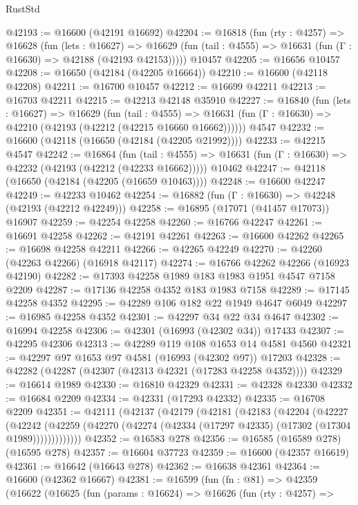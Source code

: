 \begin{lexlean}{RustStd}
\begin{coremodule}
@42193 := @16600 (@42191 @16692)
@42204 := @16818
    (fun (rty : @4257) =>
    @16628
      (fun (lets : @16627) =>
      @16629 (fun (tail : @4555) => @16631 (fun (Γ : @16630) => @42188 (@42193 @42153)))))
    @10457
@42205 := @16656 @10457
@42208 := @16650 (@42184 (@42205 @16664))
@42210 := @16600 (@42118 @42208)
@42211 := @16700 @10457
@42212 := @16699 @42211
@42213 := @16703 @42211
@42215 := @42213 @42148 @35910
@42227 := @16840
    (fun (lets : @16627) =>
    @16629
      (fun (tail : @4555) =>
      @16631 (fun (Γ : @16630) => @42210 (@42193 (@42212 (@42215 @16660 @16662))))))
    @4547
@42232 := @16600 (@42118 (@16650 (@42184 (@42205 @21992))))
@42233 := @42215 @4547
@42242 := @16864
    (fun (tail : @4555) => @16631 (fun (Γ : @16630) => @42232 (@42193 (@42212 (@42233 @16662)))))
    @10462
@42247 := @42118 (@16650 (@42184 (@42205 (@16659 @10463))))
@42248 := @16600 @42247
@42249 := @42233 @10462
@42254 := @16882 (fun (Γ : @16630) => @42248 (@42193 (@42212 @42249)))
@42258 := @16895 (@17071 (@41457 @17073)) @16907
@42259 := @42254 @42258
@42260 := @16766 @42247
@42261 := @16691 @42258
@42262 := @42191 @42261
@42263 := @16600 @42262
@42265 := @16698 @42258 @42211
@42266 := @42265 @42249
@42270 := @42260 (@42263 @42266) (@16918 @42117)
@42274 := @16766 @42262 @42266 (@16923 @42190)
@42282 := @17393 @42258 @1989 @183 @1983 @1951 @4547 @7158 @2209
@42287 := @17136 @42258 @4352 @183 @1983 @7158
@42289 := @17145 @42258 @4352
@42295 := @42289 @106 @182 @22 @1949 @4647 @6049
@42297 := @16985 @42258 @4352
@42301 := @42297 @34 @22 @34 @4647
@42302 := @16994 @42258
@42306 := @42301 (@16993 (@42302 @34)) @17433
@42307 := @42295 @42306
@42313 := @42289 @119 @108 @1653 @14 @4581 @4560
@42321 := @42297 @97 @1653 @97 @4581 (@16993 (@42302 @97)) @17203
@42328 := @42282 (@42287 (@42307 (@42313 @42321 (@17283 @42258 @4352))))
@42329 := @16614 @1989
@42330 := @16810 @42329
@42331 := @42328 @42330
@42332 := @16684 @2209
@42334 := @42331 (@17293 @42332)
@42335 := @16708 @2209
@42351 := @42111
    (@42137
      (@42179
        (@42181
          (@42183
            (@42204
              (@42227
                (@42242
                  (@42259 (@42270 (@42274 (@42334 (@17297 @42335) (@17302 (@17304 @1989)))))))))))))
@42352 := @16583 @278
@42356 := @16585 (@16589 @278) (@16595 @278)
@42357 := @16604 @37723
@42359 := @16600 (@42357 @16619)
@42361 := @16642 (@16643 @278)
@42362 := @16638 @42361
@42364 := @16600 (@42362 @16667)
@42381 := @16599
    (fun (fn : @81) =>
    @42359
      (@16622
        (@16625
          (fun (params : @16624) =>
          @16626
            (fun (rty : @4257) =>

\end{coremodule}
\end{lexlean}
